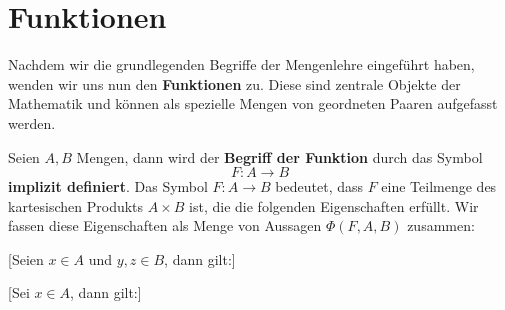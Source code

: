 \documentclass[main.tex]{subfiles}
\begin{document}

\begin{tabproof}
\end{tabproof}

\begin{tabproof}
\end{tabproof}

\chapter{Funktionen}
Nachdem wir die grundlegenden Begriffe der Mengenlehre eingeführt haben, wenden wir uns nun den 
\textbf{Funktionen} zu. Diese sind zentrale Objekte der Mathematik und können als spezielle Mengen 
von geordneten Paaren aufgefasst werden.

\begin{definition}
Seien \(A,B\) Mengen, dann wird der \textbf{Begriff der Funktion} durch das Symbol
\[
F\colon A \to B
\]
\textbf{implizit definiert}. 
Das Symbol \(F\colon A\to B\) bedeutet, dass \(F\) eine Teilmenge des kartesischen Produkts \(A\times B\) ist,
die die folgenden Eigenschaften erfüllt. Wir fassen diese Eigenschaften als Menge von Aussagen 
\(\Phi(F,A,B)\) zusammen:
\end{definition}


[Seien \(x\in A\) und \(y,z\in B\), dann gilt:]

[Sei \(x\in A\), dann gilt:]
\end{document}
